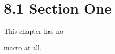 \documentclass{article}
\begin{document}
\section{8.1 Section One}
This chapter has no \title{} macro at all.
\end{document}
